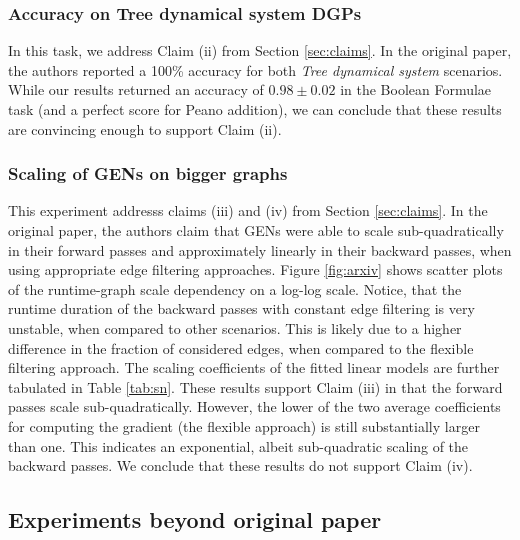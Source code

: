 \subsubsection{Accuracy on Tree dynamical system DGPs}
\label{exp:second}
In this task, we address Claim (ii) from Section \ref{sec:claims}. In the original paper, the authors reported a 100\% accuracy for both \textit{Tree dynamical system} scenarios. While our results returned an accuracy of $0.98 \pm 0.02$ in the Boolean Formulae task (and a perfect score for Peano addition), we can conclude that these results are convincing enough to support Claim (ii).





\subsubsection{Scaling of GENs on bigger graphs}
\label{exp:sn}
This experiment addresss claims (iii) and (iv) from Section \ref{sec:claims}. In the original paper, the authors claim that GENs were able to scale sub-quadratically in their forward passes and approximately linearly in their backward passes, when using appropriate edge filtering approaches. Figure \ref{fig:arxiv} shows scatter plots of the runtime-graph scale dependency on a log-log scale. Notice, that the runtime duration of the backward passes with constant edge filtering is very unstable, when compared to other scenarios. This is likely due to a higher difference in the fraction of considered edges, when compared to the flexible filtering approach. The scaling coefficients of the fitted linear models are further tabulated in Table \ref{tab:sn}. These results support Claim (iii) in that the forward passes scale sub-quadratically. However, the lower of the two average coefficients for computing the gradient (the flexible approach) is still substantially larger than one. This indicates an exponential, albeit sub-quadratic scaling of the backward passes. We conclude that these results do not support Claim (iv).

\subsection{Experiments beyond original paper}

\label{subsec:our}
 
